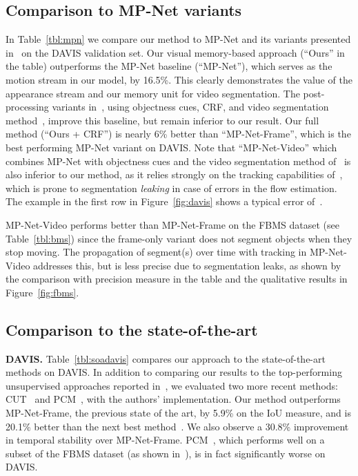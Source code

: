 \documentclass[10pt,twocolumn,letterpaper]{article}
\begin{document}
\subsection{Comparison to MP-Net variants}
\label{sec:mpc}
In Table~\ref{tbl:mpn} we compare our method to MP-Net and its variants
presented in~\cite{tokmakov2016learning} on the DAVIS validation set.  Our
visual memory-based approach (``Ours'' in the table) outperforms the MP-Net
baseline (``MP-Net''), which serves as the motion stream in our model, by
16.5\%. This clearly demonstrates the value of the appearance stream and our
memory unit for video segmentation. The post-processing variants
in~\cite{tokmakov2016learning}, using objectness cues, CRF, and video
segmentation method~\cite{papazoglou2013fast}, improve this baseline, but
remain inferior to our result. Our full method (``Ours + CRF'') is nearly 6\%
better than ``MP-Net-Frame'', which is the best performing MP-Net variant
on DAVIS. 
Note that ``MP-Net-Video'' which combines MP-Net with
objectness cues and the video segmentation method of~\cite{papazoglou2013fast}
is also inferior to our method, as it relies strongly on the tracking
capabilities of~\cite{papazoglou2013fast}, which is prone to segmentation {\it
leaking} in case of errors in the flow estimation. The example in the first row in
Figure~\ref{fig:davis} shows a typical error of~\cite{papazoglou2013fast}.

MP-Net-Video performs better than MP-Net-Frame on the FBMS dataset (see
Table~\ref{tbl:bms}) since the frame-only variant does not segment objects when
they stop moving. The propagation of segment(s) over time with tracking in
MP-Net-Video addresses this, but is less precise due to segmentation leaks, as
shown by the comparison with precision measure in the table and the qualitative
results in Figure~\ref{fig:fbms}.

\subsection{Comparison to the state-of-the-art}
\label{sec:soa}
\vspace{0.3cm}\noindent\textbf{DAVIS.}
Table~\ref{tbl:soadavis} compares our approach to the state-of-the-art methods
on DAVIS. In addition to comparing our results to the top-performing
unsupervised approaches reported in~\cite{Perazzi16}, we evaluated two more
recent methods: CUT~\cite{keuper2015motion} and PCM~\cite{Bideau16}, with the
authors' implementation. Our method outperforms
MP-Net-Frame, the previous state of the art, by 5.9\% on the IoU measure, and
is 20.1\% better than the next best method~\cite{papazoglou2013fast}. We also
observe a 30.8\% improvement in temporal stability over MP-Net-Frame.
PCM~\cite{Bideau16}, which performs well on a subset of the FBMS dataset (as
shown in~\cite{tokmakov2016learning}), is in fact significantly worse on DAVIS.
\end{document}
